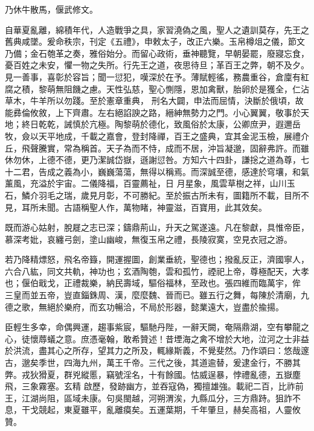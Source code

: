 \begin{pinyinscope}
 乃休牛散馬，偃武修文。



 自華夏亂離，綿積年代，人造戰爭之具，家習澆偽之風，聖人之遺訓莫存，先王之舊典咸墜。爰命秩宗，刊定《五禮》，申敕太子，改正六樂。玉帛樽俎之儀，節文乃備；金石匏革之奏，雅俗始分。而留心政術，垂神聽覽，早朝晏罷，廢寢忘食，憂百姓之未安，懼一物之失所。行先王之道，夜思待旦；革百王之弊，朝不及夕。見一善事，喜彰於容旨；聞一愆犯，嘆深於在予。薄賦輕徭，務農重谷，倉廩有紅腐之積，黎萌無阻饑之慮。天性弘慈，聖心惻隱，恩加禽獸，胎卵於是獲全，仁沾草木，牛羊所以勿踐。至於憲章重典，
 刑名大闢，申法而屈情，決斷於俄頃，故能彞倫攸敘，上下齊肅。左右絕諂諛之路，縉紳無勢力之門。小心翼翼，敬事於天地；終日乾乾，誡慎於亢極。陶黎萌於德化，致風俗於太康，公卿庶尹，遐邇岳牧，僉以天平地成，千載之嘉會，登封降禪，百王之盛典，宜其金泥玉檢，展禮介丘，飛聲騰實，常為稱首。天子為而不恃，成而不居，沖旨凝邈，固辭弗許。而雖休勿休，上德不德，更乃潔誠岱嶽，遜謝愆咎。方知六十四卦，謙捴之道為尊，七十二君，告成之義為小，巍巍蕩蕩，無得以稱焉。而深誠至德，感達於穹壤，和氣薰風，充溢於宇宙。二儀降福，百靈薦祉，日
 月星象，風雲草樹之祥，山川玉石，鱗介羽毛之瑞，歲見月彰，不可勝紀。至於振古所未有，圖籍所不載，目所不見，耳所未聞。古語稱聖人作，萬物睹，神靈滋，百寶用，此其效矣。



 既而游心姑射，脫屣之志已深；鑄鼎荊山，升天之駕遂遠。凡在黎獻，具惟帝臣，慕深考妣，哀纏弓劍，塗山幽峻，無復玉帛之禮，長陵寂寞，空見衣冠之游。



 若乃降精熛怒，飛名帝籙，開運握圖，創業垂統，聖德也；撥亂反正，濟國寧人，六合八紘，同文共軌，神功也；玄酒陶匏，雲和孤竹，禋祀上帝，尊極配天，大孝也；偃伯戢戈，正禮裁樂，納民壽域，驅俗福林，至政也。張四維而臨萬宇，侔
 三皇而並五帝，豈直錙銖周、漢，麼麼魏、晉而已。雖五行之舞，每陳於清廟，九德之歌，無絕於樂府，而玄功暢洽，不局於形器，懿業遠大，豈盡於揄揚。



 臣輕生多幸，命偶興運，趨事紫宸，驅馳丹陛，一辭天闕，奄隔鼎湖，空有攀龍之心，徒懷蓐蟻之意。庶憑毫翰，敢希贊述！昔堙海之禽不增於大地，泣河之士非益於洪流，盡其心之所存，望其力之所及，輒緣斯義，不覺斐然。乃作頌曰：悠哉邃古，邈矣季世，四海九州，萬王千帝。三代之後，其道逾替，爰逮金行，不勝其弊。戎狄猾夏，群兇縱慝，竊號淫名，十有餘國。怙威逞暴，悖禮亂德，五嶽塵飛，三象霧塞。玄精
 啟歷，發跡幽方，並吞寇偽，獨擅雄強。載祀二百，比祚前王，江湖尚阻，區域未康。句吳閩越，河朔渭涘，九縣瓜分，三方鼎跱。狙詐不息，干戈競起，東夏雖平，亂離瘼矣。五運葉期，千年肇旦，赫矣高祖，人靈攸贊。




\end{pinyinscope}
